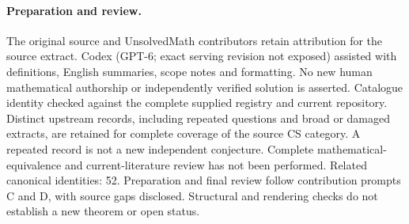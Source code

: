 \documentclass[11pt]{article}
\begin{document}
\paragraph{Preparation and review.}
The original source and UnsolvedMath contributors retain attribution for the source extract. Codex (GPT-6; exact serving revision not exposed) assisted with definitions, English summaries, scope notes and formatting. No new human mathematical authorship or independently verified solution is asserted. Catalogue identity checked against the complete supplied registry and current repository. Distinct upstream records, including repeated questions and broad or damaged extracts, are retained for complete coverage of the source CS category. A repeated record is not a new independent conjecture. Complete mathematical-equivalence and current-literature review has not been performed. Related canonical identities: 52. Preparation and final review follow contribution prompts C and D, with source gaps disclosed. Structural and rendering checks do not establish a new theorem or open status.
\label{end:statement}
\end{document}
